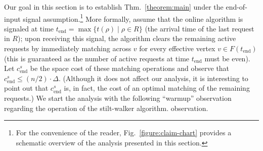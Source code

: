 \documentclass[11pt]{article}
\def\LongVersion{}
\def\LongVersionEnd{}
\def\ShortVersion{}
\def\ShortVersionEnd{}
\theoremstyle{definition}
\theoremstyle{plain}
\theoremstyle{definition}
\theoremstyle{plain}
\theoremstyle{definition}
\theoremstyle{plain}
\newcommand{\NotationLabel}[1]{\label{notationTable:#1}\ignorespaces}
\newcommand{\Thm}{Thm.}
\newcommand{\Fig}{Fig.}
\newcommand{\aTime}{\mathit{t}}
\newcommand{\EndTime}{\mathit{t}_{\mathrm{end}}}
\newcommand{\sEndCost}{\mathit{c}_{\mathrm{end}}^{\mathit{s}}}
\newcommand{\Effective}{\mathit{F}}
\begin{document}
Our goal in this section is to establish \Thm{}~\ref{theorem:main} under the
end-of-input signal assumption.\footnote{%
For the convenience of the reader, \Fig{}~\ref{figure:claim-chart} provides a
schematic overview of the analysis presented in this section.
}
More formally, assume that the online algorithm is signaled at time
$\EndTime = \max \{ \aTime(\rho) \mid \rho \in R \}$
\NotationLabel{analysis:end-time}
(the arrival time of the last request in $R$);
upon receiving this signal, the algorithm clears the remaining active
requests by immediately matching across $v$ for every effective vertex
$v \in \Effective(\EndTime)$
(this is guaranteed as the number of active requests at time $\EndTime$ must
be even).
Let
$\sEndCost$
\NotationLabel{analysis:end-cost}
be the space cost of these matching operations and observe that
$\sEndCost \leq (n / 2) \cdot \Delta$.
\LongVersion %
(Although it does not affect our analysis, it is interesting to point out that
$\sEndCost$ is, in fact, the cost of an optimal matching of the remaining
requests.)
\LongVersionEnd %
We start the analysis with the following ``warmup''
\LongVersion %
observation regarding the operation of the stilt-walker algorithm.
\LongVersionEnd %
%
\ShortVersion %
observation.
\ShortVersionEnd %
\end{document}

